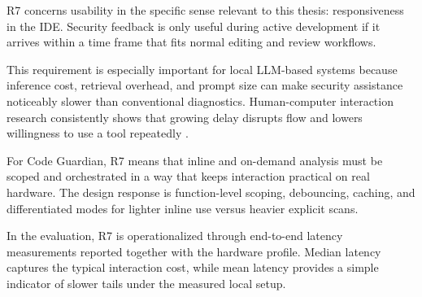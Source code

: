 \label{sec:r7-usability}

R7 concerns usability in the specific sense relevant to this thesis: responsiveness in the IDE. Security feedback is only useful during active development if it arrives within a time frame that fits normal editing and review workflows.

This requirement is especially important for local LLM-based systems because inference cost, retrieval overhead, and prompt size can make security assistance noticeably slower than conventional diagnostics. Human-computer interaction research consistently shows that growing delay disrupts flow and lowers willingness to use a tool repeatedly \cite{card1991model,nielsen1994usability}.

For Code Guardian, R7 means that inline and on-demand analysis must be scoped and orchestrated in a way that keeps interaction practical on real hardware. The design response is function-level scoping, debouncing, caching, and differentiated modes for lighter inline use versus heavier explicit scans.

In the evaluation, R7 is operationalized through end-to-end latency measurements reported together with the hardware profile. Median latency captures the typical interaction cost, while mean latency provides a simple indicator of slower tails under the measured local setup.

